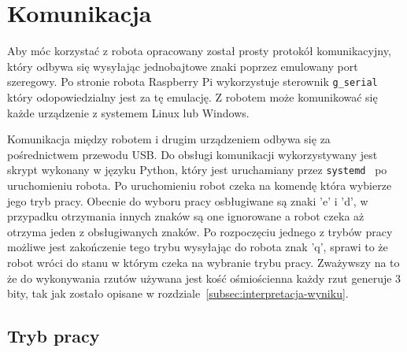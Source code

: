 \chapter{Komunikacja}\label{ch:komunikacja}
Aby móc korzystać z robota opracowany został prosty protokół komunikacyjny, który 
odbywa się wysyłając jednobajtowe znaki poprzez emulowany port szeregowy. Po stronie robota Raspberry Pi wykorzystuje 
sterownik \texttt{g\_serial}~\cite{g_serial} który odopowiedzialny jest za tę emulację. Z robotem może komunikować się 
każde urządzenie z systemem Linux lub Windows. 

Komunikacja między robotem i drugim urządzeniem odbywa się za pośrednictwem przewodu USB.
Do obsługi komunikacji wykorzystywany jest skrypt wykonany w języku Python, który jest uruchamiany 
przez \texttt{systemd}~\cite{systemd} po uruchomieniu robota. Po uruchomieniu robot czeka na komendę która wybierze jego tryb pracy.
Obecnie do wyboru pracy osbługiwane są znaki 'e' i 'd', w przypadku otrzymania innych znaków są one ignorowane a robot czeka aż otrzyma jeden z obsługiwanych znaków.
Po rozpoczęciu jednego z trybów pracy możliwe jest zakończenie tego trybu wysyłając do robota znak 'q', sprawi to że robot wróci do stanu w którym czeka na wybranie 
trybu pracy. Zważywszy na to że do wykonywania rzutów używana jest kość ośmiościenna 
każdy rzut generuje 3 bity, tak jak zostało opisane w rozdziale~\ref{subsec:interpretacja-wyniku}.


\section{Tryb pracy} \label{sec:tryby}

